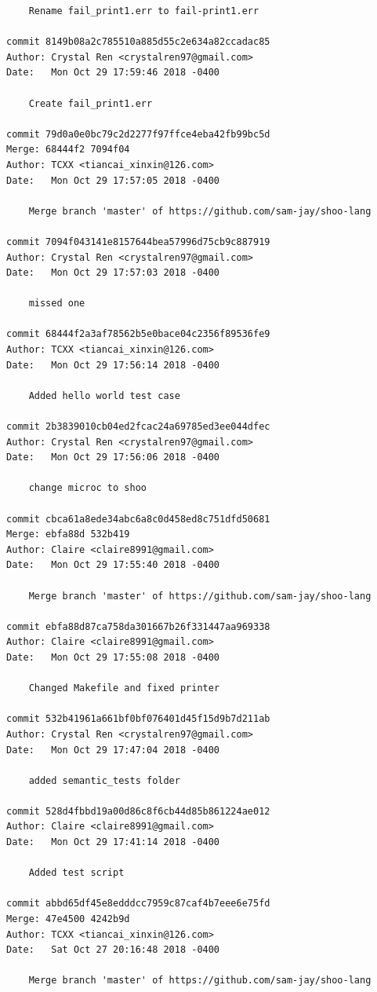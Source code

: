 \documentclass[12pt]{article}
\begin{document}
\begin{lstlisting}
    Rename fail_print1.err to fail-print1.err

commit 8149b08a2c785510a885d55c2e634a82ccadac85
Author: Crystal Ren <crystalren97@gmail.com>
Date:   Mon Oct 29 17:59:46 2018 -0400

    Create fail_print1.err

commit 79d0a0e0bc79c2d2277f97ffce4eba42fb99bc5d
Merge: 68444f2 7094f04
Author: TCXX <tiancai_xinxin@126.com>
Date:   Mon Oct 29 17:57:05 2018 -0400

    Merge branch 'master' of https://github.com/sam-jay/shoo-lang

commit 7094f043141e8157644bea57996d75cb9c887919
Author: Crystal Ren <crystalren97@gmail.com>
Date:   Mon Oct 29 17:57:03 2018 -0400

    missed one

commit 68444f2a3af78562b5e0bace04c2356f89536fe9
Author: TCXX <tiancai_xinxin@126.com>
Date:   Mon Oct 29 17:56:14 2018 -0400

    Added hello world test case

commit 2b3839010cb04ed2fcac24a69785ed3ee044dfec
Author: Crystal Ren <crystalren97@gmail.com>
Date:   Mon Oct 29 17:56:06 2018 -0400

    change microc to shoo

commit cbca61a8ede34abc6a8c0d458ed8c751dfd50681
Merge: ebfa88d 532b419
Author: Claire <claire8991@gmail.com>
Date:   Mon Oct 29 17:55:40 2018 -0400

    Merge branch 'master' of https://github.com/sam-jay/shoo-lang

commit ebfa88d87ca758da301667b26f331447aa969338
Author: Claire <claire8991@gmail.com>
Date:   Mon Oct 29 17:55:08 2018 -0400

    Changed Makefile and fixed printer

commit 532b41961a661bf0bf076401d45f15d9b7d211ab
Author: Crystal Ren <crystalren97@gmail.com>
Date:   Mon Oct 29 17:47:04 2018 -0400

    added semantic_tests folder

commit 528d4fbbd19a00d86c8f6cb44d85b861224ae012
Author: Claire <claire8991@gmail.com>
Date:   Mon Oct 29 17:41:14 2018 -0400

    Added test script

commit abbd65df45e8edddcc7959c87caf4b7eee6e75fd
Merge: 47e4500 4242b9d
Author: TCXX <tiancai_xinxin@126.com>
Date:   Sat Oct 27 20:16:48 2018 -0400

    Merge branch 'master' of https://github.com/sam-jay/shoo-lang


\end{lstlisting}
\end{document}
